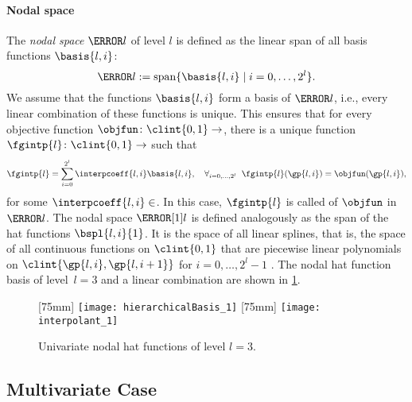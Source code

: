 \paragraph{Nodal space}

The \emph{nodal space} $\ns{l}$ of level $l$
is defined as the linear span of all basis functions
$\basis{l,i}$:
\begin{equation}
  \ns{l} := \spn\{\basis{l,i} \mid i = 0, \dotsc, 2^l\}.
\end{equation}
We assume that the functions $\basis{l,i}$ form a basis of $\ns{l}$, i.e.,
every linear combination of these functions is unique.
This ensures that for every objective function $\objfun\colon \clint{0, 1} \to \real$,
there is a unique function $\fgintp{l}\colon \clint{0, 1} \to \real$ such that
\begin{equation}
  \label{eq:interpFullGridUV}
  \fgintp{l}
  = \sum_{i=0}^{2^l} \interpcoeff{l,i} \basis{l,i},\quad
  \falarge{i = 0, \dotsc, 2^l}{\fgintp{l}(\gp{l,i}) = \objfun(\gp{l,i})},
\end{equation}
for some $\interpcoeff{l,i} \in \real$.
In this case, $\fgintp{l}$ is called  of $\objfun$ in $\ns{l}$.
The nodal space $\nsbspl{l}{1}$ is defined analogously as the span of the
hat functions $\bspl{l,i}{1}$.
It is the space of all linear splines,
that is, the space of all continuous functions on $\clint{0, 1}$ that are
piecewise linear polynomials on $\clint{\gp{l,i}, \gp{l,i+1}}$ for
$i = 0, \dotsc, 2^l - 1$ \cite{Hoellig13Approximation}.
The nodal hat function basis of level~$l = 3$
and a linear combination are shown in \cref{fig:nodalHat}.

\begin{figure}
  [75mm]{%
    \texttt{[image: hierarchicalBasis\_1]}%
  }%
  \hfill%
  [75mm]{%
    \texttt{[image: interpolant\_1]}%
  }%
  \caption[%
    Univariate nodal hat functions%
  ]{%
    Univariate nodal hat functions of level $l = 3$.%
  }%
  \label{fig:nodalHat}%
\end{figure}



\subsection{Multivariate Case}
\label{sec:212nodalMV}

